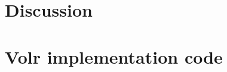 \documentclass[a4paper,oneside]{memoir}
\begin{document}
\chapter{Discussion} \label{sec:discussion}

\printbibliography
\printglossary
\printindex
 
\appendix
\chapter{Volr implementation code} \label{app:implementation}
  
\end{document}
